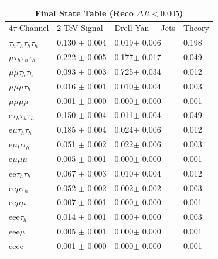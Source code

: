 \documentclass{article}
\begin{document}
 
\begin{landscape} 
\centering 
\begin{tabular}{|p{4.5cm}|p{3cm}|p{3cm}|p{3cm}|}\hline 
\multicolumn{4}{|c|}{Final State Table (Reco \(\Delta R < 0.005\))} \\ 
\hline 
4$\tau$ Channel & 2 TeV Signal & Drell-Yan + Jets & Theory \\ 
\hline 
$\tau_h$$\tau_h$$\tau_h$$\tau_h$ & 0.130 $\pm$ 0.004 & 0.019$\pm$ 0.006 & 0.198\\
\hline 
$\mu$$\tau_h$$\tau_h$$\tau_h$ & 0.222 $\pm$ 0.005 & 0.177$\pm$ 0.017 & 0.049\\
\hline 
$\mu$$\mu$$\tau_h$$\tau_h$ & 0.093 $\pm$ 0.003 & 0.725$\pm$ 0.034 & 0.012\\
\hline 
$\mu$$\mu$$\mu$$\tau_h$ & 0.016 $\pm$ 0.001 & 0.010$\pm$ 0.004 & 0.003\\
\hline 
$\mu$$\mu$$\mu$$\mu$ & 0.001 $\pm$ 0.000 & 0.000$\pm$ 0.000 & 0.001\\
\hline 
e$\tau_h$$\tau_h$$\tau_h$ & 0.150 $\pm$ 0.004 & 0.011$\pm$ 0.004 & 0.049\\
\hline 
e$\mu$$\tau_h$$\tau_h$ & 0.185 $\pm$ 0.004 & 0.024$\pm$ 0.006 & 0.012\\
\hline 
e$\mu$$\mu$$\tau_h$ & 0.051 $\pm$ 0.002 & 0.022$\pm$ 0.006 & 0.003\\
\hline 
e$\mu$$\mu$$\mu$ & 0.005 $\pm$ 0.001 & 0.000$\pm$ 0.000 & 0.001\\
\hline 
ee$\tau_h$$\tau_h$ & 0.067 $\pm$ 0.003 & 0.010$\pm$ 0.004 & 0.012\\
\hline 
ee$\mu$$\tau_h$ & 0.052 $\pm$ 0.002 & 0.002$\pm$ 0.002 & 0.003\\
\hline 
ee$\mu$$\mu$ & 0.007 $\pm$ 0.001 & 0.000$\pm$ 0.000 & 0.001\\
\hline 
eee$\tau_h$ & 0.014 $\pm$ 0.001 & 0.000$\pm$ 0.000 & 0.003\\
\hline 
eee$\mu$ & 0.005 $\pm$ 0.001 & 0.000$\pm$ 0.000 & 0.001\\
\hline 
eeee & 0.001 $\pm$ 0.000 & 0.000$\pm$ 0.000 & 0.001\\
\hline 
\end{tabular} 
\end{landscape} 
\end{document}
